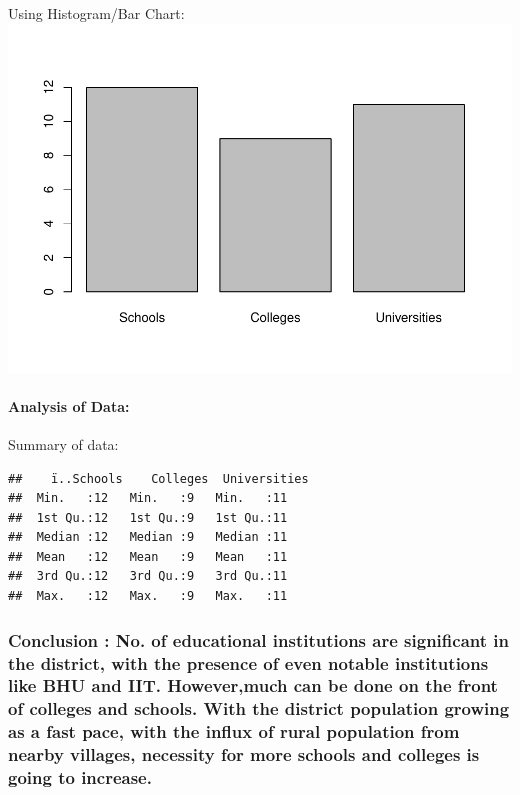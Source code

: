 \documentclass[]{article}
\let\oldparagraph\paragraph
\renewcommand{\paragraph}[1]{\oldparagraph{#1}\mbox{}}
\begin{document}
Using Histogram/Bar Chart:
\includegraphics{Report_files/figure-latex/unnamed-chunk-19-1.pdf}

\paragraph{Analysis of Data:}\label{analysis-of-data-4}

Summary of data:

\begin{verbatim}
##    ï..Schools    Colleges  Universities
##  Min.   :12   Min.   :9   Min.   :11   
##  1st Qu.:12   1st Qu.:9   1st Qu.:11   
##  Median :12   Median :9   Median :11   
##  Mean   :12   Mean   :9   Mean   :11   
##  3rd Qu.:12   3rd Qu.:9   3rd Qu.:11   
##  Max.   :12   Max.   :9   Max.   :11
\end{verbatim}

\subsubsection{\texorpdfstring{\textbf{Conclusion} : No. of educational
institutions are significant in the district, with the presence of even
notable institutions like BHU and IIT. However,much can be done on the
front of colleges and schools. With the district population growing as a
fast pace, with the influx of rural population from nearby villages,
necessity for more schools and colleges is going to
increase.}{Conclusion : No. of educational institutions are significant in the district, with the presence of even notable institutions like BHU and IIT. However,much can be done on the front of colleges and schools. With the district population growing as a fast pace, with the influx of rural population from nearby villages, necessity for more schools and colleges is going to increase.}}\label{conclusion-no.-of-educational-institutions-are-significant-in-the-district-with-the-presence-of-even-notable-institutions-like-bhu-and-iit.-howevermuch-can-be-done-on-the-front-of-colleges-and-schools.-with-the-district-population-growing-as-a-fast-pace-with-the-influx-of-rural-population-from-nearby-villages-necessity-for-more-schools-and-colleges-is-going-to-increase.}
\end{document}
